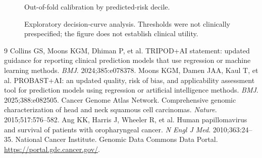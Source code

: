 \documentclass[11pt]{article}
\begin{document}
\begin{figure}[H]
\centering
{}
\caption{Out-of-fold calibration by predicted-risk decile.}
\end{figure}

\begin{figure}[H]
\centering
{}
\caption{Exploratory decision-curve analysis. Thresholds were not clinically prespecified; the figure does not establish clinical utility.}
\end{figure}

\begin{thebibliography}{9}
 Collins GS, Moons KGM, Dhiman P, et al. TRIPOD+AI statement: updated guidance for reporting clinical prediction models that use regression or machine learning methods. \textit{BMJ}. 2024;385:e078378.
 Moons KGM, Damen JAA, Kaul T, et al. PROBAST+AI: an updated quality, risk of bias, and applicability assessment tool for prediction models using regression or artificial intelligence methods. \textit{BMJ}. 2025;388:e082505.
 Cancer Genome Atlas Network. Comprehensive genomic characterization of head and neck squamous cell carcinomas. \textit{Nature}. 2015;517:576--582.
 Ang KK, Harris J, Wheeler R, et al. Human papillomavirus and survival of patients with oropharyngeal cancer. \textit{N Engl J Med}. 2010;363:24--35.
 National Cancer Institute. Genomic Data Commons Data Portal. \url{https://portal.gdc.cancer.gov/}.
\end{thebibliography}
\end{document}
